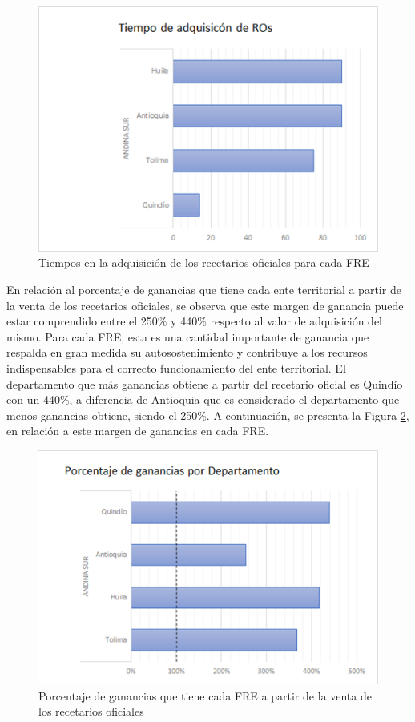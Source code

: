 \documentclass[
]{book}
\begin{document}
\begin{figure}
\includegraphics[width=0.5\linewidth]{figures/Imagen11} \caption{Tiempos en la adquisición de los recetarios oficiales para cada FRE}\label{fig:TiempoAdquisicionRegionAndinaSur}
\end{figure}

En relación al porcentaje de ganancias que tiene cada ente territorial a partir de la venta de los recetarios oficiales, se observa que este margen de ganancia puede estar comprendido entre el 250\% y 440\% respecto al valor de adquisición del mismo. Para cada FRE, esta es una cantidad importante de ganancia que respalda en gran medida su autosostenimiento y contribuye a los recursos indispensables para el correcto funcionamiento del ente territorial. El departamento que más ganancias obtiene a partir del recetario oficial es Quindío con un 440\%, a diferencia de Antioquia que es considerado el departamento que menos ganancias obtiene, siendo el 250\%. A continuación, se presenta la Figura \ref{fig:PorcAdquisicionRegionAndinaSur}, en relación a este margen de ganancias en cada FRE.

\begin{figure}

{\centering \includegraphics[width=0.5\linewidth]{figures/Imagen12} 

}

\caption{Porcentaje de ganancias que tiene cada FRE a partir de la venta de los recetarios oficiales}\label{fig:PorcAdquisicionRegionAndinaSur}
\end{figure}
\end{document}
